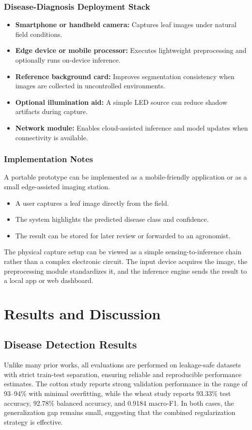 \documentclass[12pt,a4paper]{report}
\begin{document}
\subsubsection{Disease-Diagnosis Deployment Stack}
\begin{itemize}
\item \textbf{Smartphone or handheld camera:} Captures leaf images under natural field conditions.
\item \textbf{Edge device or mobile processor:} Executes lightweight preprocessing and optionally runs on-device inference.
\item \textbf{Reference background card:} Improves segmentation consistency when images are collected in uncontrolled environments.
\item \textbf{Optional illumination aid:} A simple LED source can reduce shadow artifacts during capture.
\item \textbf{Network module:} Enables cloud-assisted inference and model updates when connectivity is available.
\end{itemize}

\subsubsection{Implementation Notes}
A portable prototype can be implemented as a mobile-friendly application or as a small edge-assisted imaging station.
\begin{itemize}
\item A user captures a leaf image directly from the field.
\item The system highlights the predicted disease class and confidence.
\item The result can be stored for later review or forwarded to an agronomist.
\end{itemize}
The physical capture setup can be viewed as a simple sensing-to-inference chain rather than a complex electronic circuit. The input device acquires the image, the preprocessing module standardizes it, and the inference engine sends the result to a local app or web dashboard.

\section{Results and Discussion}

\subsection{Disease Detection Results}
Unlike many prior works, all evaluations are performed on leakage-safe datasets with strict train-test separation, ensuring reliable and reproducible performance estimates. The cotton study reports strong validation performance in the range of 93--94\% with minimal overfitting, while the wheat study reports 93.33\% test accuracy, 92.78\% balanced accuracy, and 0.9184 macro-F1. In both cases, the generalization gap remains small, suggesting that the combined regularization strategy is effective.
\end{document}
